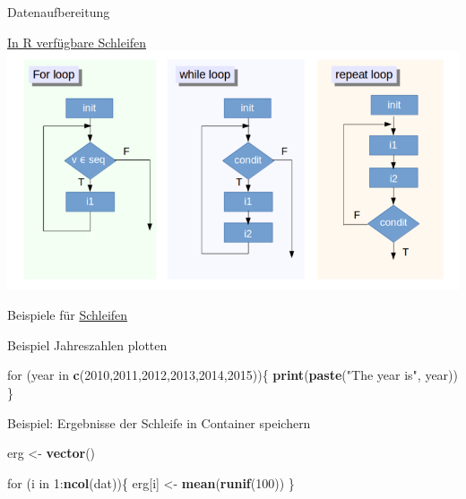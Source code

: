 \documentclass[ignorenonframetext,]{beamer}
\newenvironment{Shaded}{}{}
\newcommand{\KeywordTok}[1]{\textcolor[rgb]{0.00,0.44,0.13}{\textbf{{#1}}}}
\newcommand{\DecValTok}[1]{\textcolor[rgb]{0.25,0.63,0.44}{{#1}}}
\newcommand{\StringTok}[1]{\textcolor[rgb]{0.25,0.44,0.63}{{#1}}}
\newcommand{\NormalTok}[1]{{#1}}
\begin{document}
\begin{frame}[fragile]{Datenaufbereitung}
\begin{block}{\href{https://www.datacamp.com/community/tutorials/tutorial-on-loops-in-r\#gs.e=BY75k}{In
R verfügbare Schleifen}}
\includegraphics{./tex2pdf.9796/645ce298d09f8b6a04c4b9ecab4d619cedfffc6d.png}

\end{block}

\begin{block}{Beispiele für
\href{https://www.r-bloggers.com/how-to-write-the-first-for-loop-in-r/}{Schleifen}}

\begin{block}{Beispiel Jahreszahlen plotten}

\begin{Shaded}
\begin{Highlighting}[]
\NormalTok{for (year in }\KeywordTok{c}\NormalTok{(}\DecValTok{2010}\NormalTok{,}\DecValTok{2011}\NormalTok{,}\DecValTok{2012}\NormalTok{,}\DecValTok{2013}\NormalTok{,}\DecValTok{2014}\NormalTok{,}\DecValTok{2015}\NormalTok{))\{}
  \KeywordTok{print}\NormalTok{(}\KeywordTok{paste}\NormalTok{(}\StringTok{"The year is"}\NormalTok{, year))}
\NormalTok{\}}
\end{Highlighting}
\end{Shaded}

\end{block}

\begin{block}{Beispiel: Ergebnisse der Schleife in Container speichern}

\begin{Shaded}
\begin{Highlighting}[]
\NormalTok{erg <-}\StringTok{ }\KeywordTok{vector}\NormalTok{()}

\NormalTok{for (i in }\DecValTok{1}\NormalTok{:}\KeywordTok{ncol}\NormalTok{(dat))\{}
  \NormalTok{erg[i] <-}\StringTok{ }\KeywordTok{mean}\NormalTok{(}\KeywordTok{runif}\NormalTok{(}\DecValTok{100}\NormalTok{))}
\NormalTok{\}}
\end{Highlighting}
\end{Shaded}


\end{block}
\end{block}
\end{frame}
\end{document}
